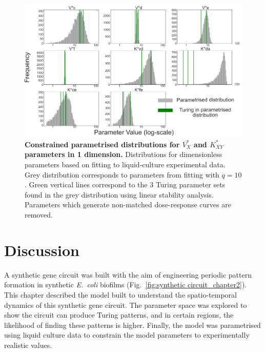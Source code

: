 \begin{figure}[H] %
    \centering
    \begin{adjustbox}{center}
        \includegraphics[width=1\textwidth]{chapters/Chapter 2/1d_distributions} %
    \end{adjustbox}
    \caption{\textbf{Constrained parametrised distributions for $V^*_X$ and $K^*_{XY}$ parameters in 1 dimension.}
    Distributions for dimensionless parameters based on fitting to liquid-culture experimental data.
    Grey distribution corresponds to parameters from fitting with $q=10$.
    Green vertical lines correspond to the 3 Turing parameter sets
    found in the grey distribution using linear stability analysis. Parameters which generate non-matched dose-response curves are removed.}
    \label{fig:1d_distributions} %
\end{figure}

\section{Discussion}
A synthetic gene circuit was built with the aim of engineering periodic pattern formation in synthetic \textit{E.~coli} biofilms (Fig.~\ref{fig:synthetic circuit_chapter2}).
This chapter described the model built to understand the spatio-temporal dynamics of this synthetic gene circuit.
The parameter space was explored to show the circuit can produce Turing patterns, and in certain regions, the likelihood of finding these patterns is higher.
Finally, the model was parametrised using liquid culture data to constrain the model parameters to experimentally realistic values.

